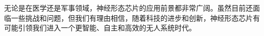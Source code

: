 \documentclass{thuemp}
\begin{document}
无论是在医学还是军事领域，神经形态芯片的应用前景都非常广阔。虽然目前还面临一些挑战和问题，但我们有理由相信，随着科技的进步和创新，神经形态芯片有可能引领我们进入一个更智能、自主和高效的无人系统时代。





% 
% 
\end{document}
